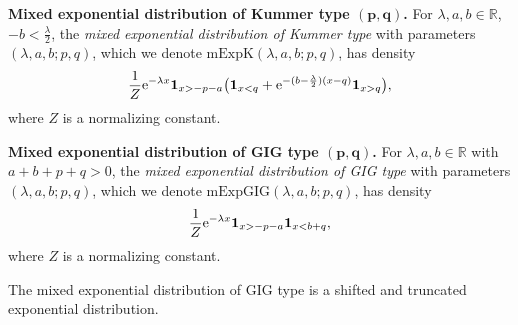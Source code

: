 \documentclass[pdftex]{sigma}
\numberwithin{equation}{section}
\def\R{\mathbb{R}}
\newcommand{\la}{\lambda}
\begin{document}
{\bf Mixed exponential distribution of Kummer type $\boldsymbol{(p, q)}$.} For $\lambda,a,b \in \R$, $-b < \frac{\lambda}{2}$, the \emph{mixed exponential distribution of Kummer type} with parameters $(\lambda,a,b ; p, q)$, which we denote $\mathrm{mExpK} (\lambda,a,b ; p, q)$, has density
\[\frac{1}{Z}{\rm e}^{-\lambda x} \mathbf{1}_{x > -p-a} \bigl(\mathbf{1}_{x < q}+{\rm e}^{-(b-\frac{\la}{2})(x-q)}\mathbf{1}_{x > q} \bigr) ,\]
where $Z$ is a normalizing constant.

{\bf Mixed exponential distribution of GIG type $\boldsymbol{(p, q)}$.} For $\lambda,a,b \in \R$ with $a+b+p+q>0$, the \emph{mixed exponential distribution of GIG type} with parameters $(\lambda,a,b ; p, q)$, which we denote $\mathrm{mExpGIG} (\lambda,a,b ; p, q)$, has density
\[\frac{1}{Z}{\rm e}^{-\lambda x} \mathbf{1}_{x > -p-a} \mathbf{1}_{x <b+ q} ,\]
where $Z$ is a normalizing constant.

\begin{Remark}
 The mixed exponential distribution of GIG type is a shifted and truncated exponential distribution.
\end{Remark}
\end{document}
